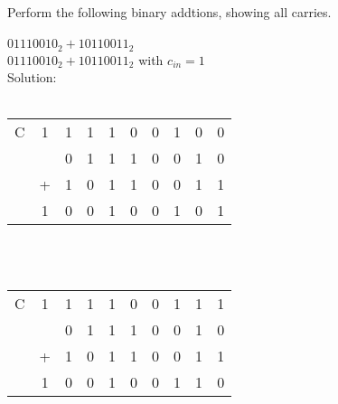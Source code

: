 Perform the following binary addtions, showing all carries. \\
\\
$01110010_2 + 10110011_2$ \\
$01110010_2 + 10110011_2$ with $c_{in}=1$\\

Solution: \\
\\
\begin{tabular}{cccccccccc}
  C & 1 & 1 & 1 & 1 & 0 & 0 & 1 & 0 & 0 \\
    &   & 0 & 1 & 1 & 1 & 0 & 0 & 1 & 0 \\
    & + & 1 & 0 & 1 & 1 & 0 & 0 & 1 & 1 \\
  \hline
    & 1 & 0 & 0 & 1 & 0 & 0 & 1 & 0 & 1 \\
\end{tabular} \\
\\
\begin{tabular}{cccccccccc}
  C & 1 & 1 & 1 & 1 & 0 & 0 & 1 & 1 & 1 \\
    &   & 0 & 1 & 1 & 1 & 0 & 0 & 1 & 0 \\
    & + & 1 & 0 & 1 & 1 & 0 & 0 & 1 & 1 \\
  \hline
    & 1 & 0 & 0 & 1 & 0 & 0 & 1 & 1 & 0 \\
\end{tabular} \\
